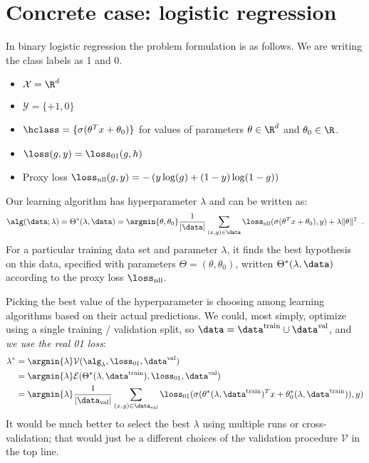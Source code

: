\section{Concrete case: logistic regression}
In binary logistic regression the problem formulation is as follows.
We are writing the class labels as 1 and 0.
\begin{itemize}
  \item $\mathcal{X} = \R^d$
  \item $\mathcal{Y} = \{+1, 0\}$
  \item $\hclass = \{\sigma(\theta^T x + \theta_0)\}$ for values of
    parameters $\theta \in \R^d$ and $\theta_0 \in \R$.
  \item $\loss(g, y) = \loss_{01}(g, h)$
  \item Proxy loss $\loss_\text{nll}(g, y) = -\left(y \log (g) + (1 - y)\log (1 -g)\right)$
  \end{itemize}

Our learning algorithm has hyperparameter $\lambda$ and can be written
as:
\[\alg(\data; \lambda) = \Theta^*(\lambda, \data) = \argmin{\theta, \theta_0}
    \frac{1}{|\data|} \sum_{(x, y) \in \data} \loss_\text{nll}(\sigma(\theta^Tx +
    \theta_0), y) + \lambda\|\theta\|^2 \;\;.\]
 For a particular training data set and parameter $\lambda$, it finds
 the best hypothesis on this data, specified with parameters $\Theta =
 (\theta, \theta_0)$, written  $\Theta^*(\lambda, \data)$ according to
 the proxy loss $\loss_\text{nll}$. 

 Picking the best value of the hyperparameter is choosing among
 learning algorithms based on their actual predictions. We could, most simply,
 optimize using a single training / validation split, so $\data =
 \data^\text{train} \cup \data^\text{val}$, and {\em we use the real
   01 loss}:
\begin{align*}
\lambda^* & = \argmin{\lambda} \mathcal{V}(\alg_\lambda, \loss_{01},
            \data^\text{val})\\
  & = \argmin{\lambda} \mathcal{E}(\Theta^*(\lambda, \data^\text{train}), \loss_{01},
    \data^\text{val}) \\
  & = \argmin{\lambda} \frac{1}{|\data_\text{val}|} \sum_{(x, y) \in
    \data_\text{val}} \loss_{01}(\sigma(\theta^*(\lambda, \data^\text{train})^T x +
    \theta^*_0(\lambda, \data^\text{train})), y)
\end{align*}
It would be much better to select the best $\lambda$ using multiple
runs or cross-validation;  that would just be a different choices of
the validation procedure $\mathcal{V}$ in the top line.

